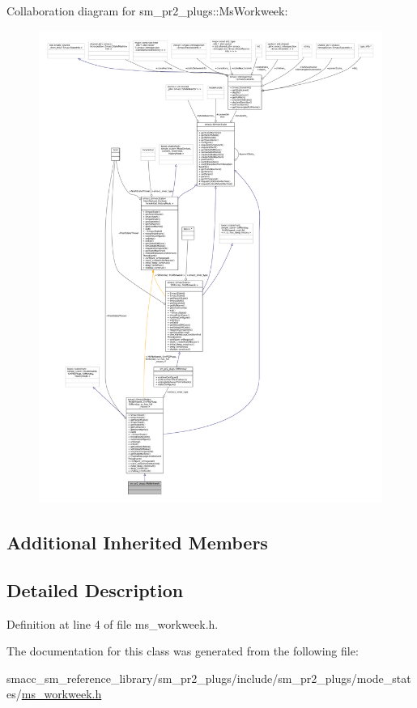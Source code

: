 Collaboration diagram for sm\+\_\+pr2\+\_\+plugs\+:\+:Ms\+Workweek\+:
\nopagebreak
\begin{figure}[H]
\begin{center}
\leavevmode
\includegraphics[width=350pt]{classsm__pr2__plugs_1_1MsWorkweek__coll__graph}
\end{center}
\end{figure}
\subsection*{Additional Inherited Members}


\subsection{Detailed Description}


Definition at line 4 of file ms\+\_\+workweek.\+h.



The documentation for this class was generated from the following file\+:\begin{DoxyCompactItemize}
\item 
smacc\+\_\+sm\+\_\+reference\+\_\+library/sm\+\_\+pr2\+\_\+plugs/include/sm\+\_\+pr2\+\_\+plugs/mode\+\_\+states/\hyperlink{sm__pr2__plugs_2include_2sm__pr2__plugs_2mode__states_2ms__workweek_8h}{ms\+\_\+workweek.\+h}\end{DoxyCompactItemize}
